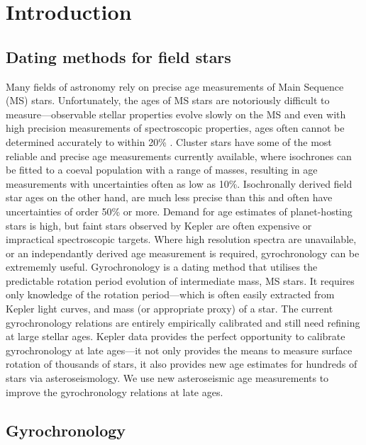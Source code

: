 \documentclass[12pt,preprint]{aastex}
\begin{document}
\section{Introduction}
\label{intro}
\subsection{Dating methods for field stars}

Many fields of astronomy rely on precise age measurements of Main Sequence (MS) stars.
Unfortunately, the ages of MS stars are notoriously difficult to measure---observable stellar properties evolve slowly on the MS and even with high precision measurements of spectroscopic properties, ages often cannot be determined accurately to within 20\% \citep{Soderblom2010}.
Cluster stars have some of the most reliable and precise age measurements currently available, where isochrones can be fitted to a coeval population with a range of masses, resulting in age measurements with uncertainties often as low as 10\%.
Isochronally derived field star ages on the other hand, are much less precise than this and often have uncertainties of order 50\% or more.
Demand for age estimates of planet-hosting stars is high, but faint stars observed by Kepler are often expensive or impractical spectroscopic targets.
Where high resolution spectra are unavailable, or an independantly derived age measurement is required, gyrochronology can be extrememly useful.
Gyrochronology is a dating method that utilises the predictable rotation period evolution of intermediate mass, MS stars.
It requires only knowledge of the rotation period---which is often easily extracted from Kepler light curves, and mass (or appropriate proxy) of a star.
The current gyrochronology relations are entirely empirically calibrated and still need refining at large stellar ages.
Kepler data provides the perfect opportunity to calibrate gyrochronology at late ages---it not only provides the means to measure surface rotation of thousands of stars, it also provides new age estimates for hundreds of stars via asteroseismology.
We use new asteroseismic age measurements to improve the gyrochronology relations at late ages.

\subsection{Gyrochronology}
\end{document}
